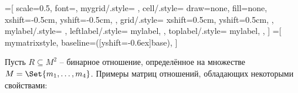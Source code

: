 \documentclass[a4paper,10pt]{article}
\begin{document}
\newcommand\drawlabelnorth[1]{%
    \node[above,align=center] at (current bounding box.north) {#1};
}
\newcommand\drawlabelsouth[1]{%
    \node[below,align=center] at (current bounding box.south) {#1};
}

=[
    scale=0.5,
    font=\small,
    mygrid/.style={
    },
    cell/.style={ %
        draw=none,
        fill=none,
        xshift=-0.5cm,
        yshift=-0.5cm,
    },
    grid/.style={ %
        xshift=0.5cm,
        yshift=0.5cm,
    },
    mylabel/.style={
    },
    leftlabel/.style={
        mylabel,
    },
    toplabel/.style={
        mylabel,
    },
]
=[
    mymatrixstyle,
    baseline={([yshift=-0.6ex]base)},
]

\def\matrixsize{4}

Пусть $R \subseteq M^2$ \--- бинарное отношение, определённое на множестве $M = \Set{m_1, \dotsc, m_{\matrixsize}}$.
Примеры матриц отношений, обладающих некоторыми свойствами:
\end{document}
